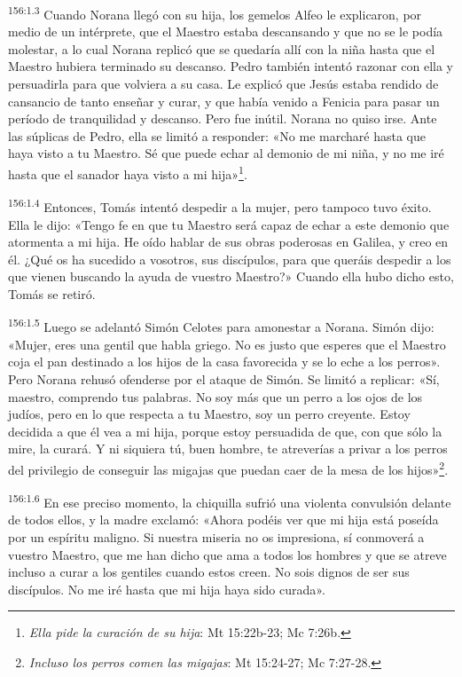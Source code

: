 \par 
\textsuperscript{156:1.3} Cuando Norana llegó con su hija, los gemelos Alfeo le explicaron, por medio de un intérprete, que el Maestro estaba descansando y que no se le podía molestar, a lo cual Norana replicó que se quedaría allí con la niña hasta que el Maestro hubiera terminado su descanso. Pedro también intentó razonar con ella y persuadirla para que volviera a su casa. Le explicó que Jesús estaba rendido de cansancio de tanto enseñar y curar, y que había venido a Fenicia para pasar un período de tranquilidad y descanso. Pero fue inútil. Norana no quiso irse. Ante las súplicas de Pedro, ella se limitó a responder: «No me marcharé hasta que haya visto a tu Maestro. Sé que puede echar al demonio de mi niña, y no me iré hasta que el sanador haya visto a mi hija»\footnote{\textit{Ella pide la curación de su hija}: Mt 15:22b-23; Mc 7:26b.}.

\par 
\textsuperscript{156:1.4} Entonces, Tomás intentó despedir a la mujer, pero tampoco tuvo éxito. Ella le dijo: «Tengo fe en que tu Maestro será capaz de echar a este demonio que atormenta a mi hija. He oído hablar de sus obras poderosas en Galilea, y creo en él. ¿Qué os ha sucedido a vosotros, sus discípulos, para que queráis despedir a los que vienen buscando la ayuda de vuestro Maestro?» Cuando ella hubo dicho esto, Tomás se retiró.

\par 
\textsuperscript{156:1.5} Luego se adelantó Simón Celotes para amonestar a Norana. Simón dijo: «Mujer, eres una gentil que habla griego. No es justo que esperes que el Maestro coja el pan destinado a los hijos de la casa favorecida y se lo eche a los perros». Pero Norana rehusó ofenderse por el ataque de Simón. Se limitó a replicar: «Sí, maestro, comprendo tus palabras. No soy más que un perro a los ojos de los judíos, pero en lo que respecta a tu Maestro, soy un perro creyente. Estoy decidida a que él vea a mi hija, porque estoy persuadida de que, con que sólo la mire, la curará. Y ni siquiera tú, buen hombre, te atreverías a privar a los perros del privilegio de conseguir las migajas que puedan caer de la mesa de los hijos»\footnote{\textit{Incluso los perros comen las migajas}: Mt 15:24-27; Mc 7:27-28.}.

\par 
\textsuperscript{156:1.6} En ese preciso momento, la chiquilla sufrió una violenta convulsión delante de todos ellos, y la madre exclamó: «Ahora podéis ver que mi hija está poseída por un espíritu maligno. Si nuestra miseria no os impresiona, sí conmoverá a vuestro Maestro, que me han dicho que ama a todos los hombres y que se atreve incluso a curar a los gentiles cuando estos creen. No sois dignos de ser sus discípulos. No me iré hasta que mi hija haya sido curada».

